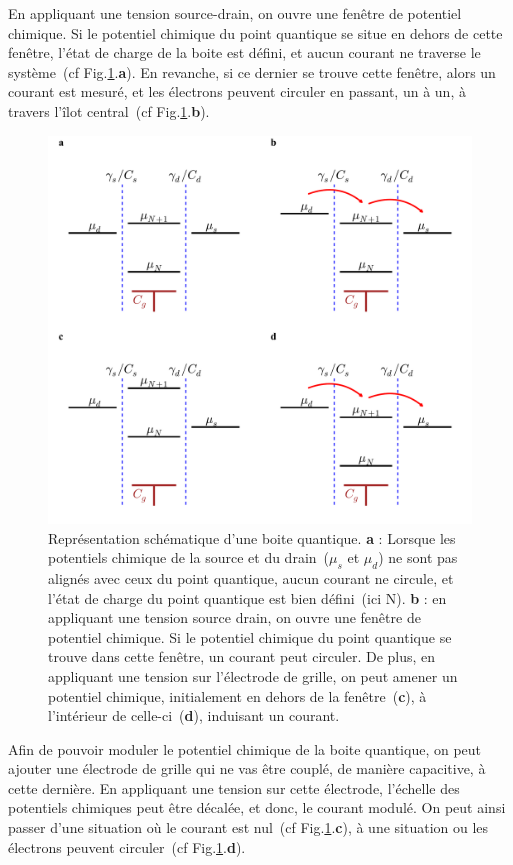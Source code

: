 En appliquant une tension source-drain, on ouvre une fenêtre de potentiel chimique. Si le potentiel chimique du point quantique se situe en dehors de cette fen\^etre, l'état de charge de la boite est défini, et aucun courant ne traverse le système~(cf Fig.\ref{DotSchem}.\textbf{a}). En revanche, si ce dernier se trouve cette fen\^etre, alors un courant est mesuré, et les électrons peuvent circuler en passant, un à un, à travers l'\^ilot central~(cf Fig.\ref{DotSchem}.\textbf{b}). 

\begin{figure}
\centering \includegraphics[scale=0.45]{Resultats/DotSchem/DotSchem.pdf} 
\caption{Représentation schématique d'une boite quantique. \textbf{a} : Lorsque les potentiels chimique de la source et du drain~($\mu_s$ et $\mu_d$) ne sont pas alignés avec ceux du point quantique, aucun courant ne circule, et l'état de charge du point quantique est bien défini~(ici N). \textbf{b} : en appliquant une tension source drain, on ouvre une fenêtre de potentiel chimique. Si le potentiel chimique du point quantique se trouve dans cette fenêtre, un courant peut circuler. De plus, en appliquant une tension sur l'électrode de grille, on peut amener un potentiel chimique, initialement en dehors de la fenêtre~(\textbf{c}), à l'intérieur de celle-ci~(\textbf{d}), induisant un courant.}
\label{DotSchem}
\end{figure}


Afin de pouvoir moduler le potentiel chimique de la boite quantique, on peut ajouter une électrode de grille qui ne vas être couplé, de manière capacitive, à cette dernière. En appliquant une tension sur cette électrode, l'échelle des potentiels chimiques peut être décalée, et donc, le courant modulé. On peut ainsi passer d'une situation où le courant est nul~(cf Fig.\ref{DotSchem}.\textbf{c}), à une situation ou les électrons peuvent circuler~(cf Fig.\ref{DotSchem}.\textbf{d}).

